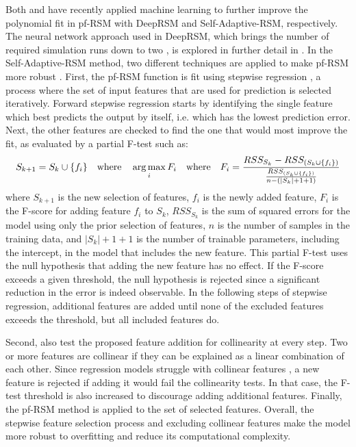 \newpar Both \textcite{deep-rsm-2020} and \textcite{self-adaptive-rsm-2022} have recently applied machine learning to further improve the polynomial fit in pf-RSM with DeepRSM and Self-Adaptive-RSM, respectively. The neural network approach used in DeepRSM, which brings the number of required simulation runs down to two \cite{deep-rsm-2020}, is explored in further detail in . In the Self-Adaptive-RSM method, two different techniques are applied to make pf-RSM more robust \cite{self-adaptive-rsm-2022}. First, the pf-RSM function is fit using stepwise regression \cite[e.g.][]{stepwise-regression-2010}, a process where the set of input features that are used for prediction is selected iteratively. Forward stepwise regression starts by identifying the single feature which best predicts the output by itself, i.e. which has the lowest prediction error. Next, the other features are checked to find the one that would most improve the fit, as evaluated by a partial F-test \cite{self-adaptive-rsm-2022} such as:
\begin{equation*}
    S_{k+1} = S_k \cup \{ f_i \} \quad \text{where} \quad \operatorname*{arg\,max}_{i} F_i \quad \text{where} \quad F_i = \frac{RSS_{S_k} - RSS_{(S_k \cup \{f_i\})}}{\frac{RSS_{(S_k \cup \{f_i\})}}{n - (|S_k| + 1 + 1)}}
\end{equation*}
where $S_{k+1}$ is the new selection of features, $f_i$ is the newly added feature, $F_i$ is the F-score for adding feature $f_i$ to $S_k$, $RSS_{S_k}$ is the sum of squared errors for the model using only the prior selection of features, $n$ is the number of samples in the training data, and $|S_k| + 1 + 1$ is the number of trainable parameters, including the intercept, in the model that includes the new feature. This partial F-test uses the null hypothesis that adding the new feature has no effect. If the F-score exceeds a given threshold, the null hypothesis is rejected since a significant reduction in the error is indeed observable. In the following steps of stepwise regression, additional features are added until none of the excluded features exceeds the threshold, but all included features do.

Second, \citeauthor{self-adaptive-rsm-2022} also test the proposed feature addition for collinearity at every step. Two or more features are collinear if they can be explained as a linear combination of each other. Since regression models struggle with collinear features \cite{regression-collinearity-1984}, a new feature is rejected if adding it would fail the collinearity tests. In that case, the F-test threshold is also increased to discourage adding additional features. Finally, the pf-RSM method is applied to the set of selected features. Overall, the stepwise feature selection process and excluding collinear features make the model more robust to overfitting and reduce its computational complexity.

